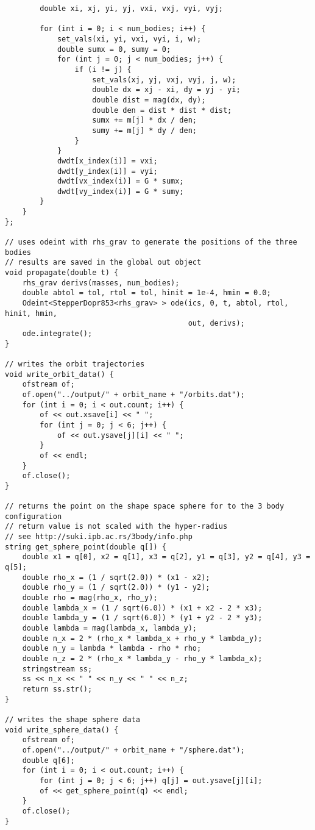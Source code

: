 \documentclass[12pt]{article}
\begin{document}
\begin{lstlisting}
        double xi, xj, yi, yj, vxi, vxj, vyi, vyj;

        for (int i = 0; i < num_bodies; i++) {
            set_vals(xi, yi, vxi, vyi, i, w);
            double sumx = 0, sumy = 0;
            for (int j = 0; j < num_bodies; j++) {
                if (i != j) {
                    set_vals(xj, yj, vxj, vyj, j, w);
                    double dx = xj - xi, dy = yj - yi;
                    double dist = mag(dx, dy);
                    double den = dist * dist * dist;
                    sumx += m[j] * dx / den;
                    sumy += m[j] * dy / den;
                }
            }
            dwdt[x_index(i)] = vxi;
            dwdt[y_index(i)] = vyi;
            dwdt[vx_index(i)] = G * sumx;
            dwdt[vy_index(i)] = G * sumy;
        }
    }
};

// uses odeint with rhs_grav to generate the positions of the three bodies
// results are saved in the global out object
void propagate(double t) {
    rhs_grav derivs(masses, num_bodies);
    double abtol = tol, rtol = tol, hinit = 1e-4, hmin = 0.0;
    Odeint<StepperDopr853<rhs_grav> > ode(ics, 0, t, abtol, rtol, hinit, hmin,
                                          out, derivs);
    ode.integrate();
}

// writes the orbit trajectories
void write_orbit_data() {
    ofstream of;
    of.open("../output/" + orbit_name + "/orbits.dat");
    for (int i = 0; i < out.count; i++) {
        of << out.xsave[i] << " ";
        for (int j = 0; j < 6; j++) {
            of << out.ysave[j][i] << " ";
        }
        of << endl;
    }
    of.close();
}

// returns the point on the shape space sphere for to the 3 body configuration
// return value is not scaled with the hyper-radius
// see http://suki.ipb.ac.rs/3body/info.php
string get_sphere_point(double q[]) {
    double x1 = q[0], x2 = q[1], x3 = q[2], y1 = q[3], y2 = q[4], y3 = q[5];
    double rho_x = (1 / sqrt(2.0)) * (x1 - x2);
    double rho_y = (1 / sqrt(2.0)) * (y1 - y2);
    double rho = mag(rho_x, rho_y);
    double lambda_x = (1 / sqrt(6.0)) * (x1 + x2 - 2 * x3);
    double lambda_y = (1 / sqrt(6.0)) * (y1 + y2 - 2 * y3);
    double lambda = mag(lambda_x, lambda_y);
    double n_x = 2 * (rho_x * lambda_x + rho_y * lambda_y);
    double n_y = lambda * lambda - rho * rho;
    double n_z = 2 * (rho_x * lambda_y - rho_y * lambda_x);
    stringstream ss;
    ss << n_x << " " << n_y << " " << n_z;
    return ss.str();
}

// writes the shape sphere data
void write_sphere_data() {
    ofstream of;
    of.open("../output/" + orbit_name + "/sphere.dat");
    double q[6];
    for (int i = 0; i < out.count; i++) {
        for (int j = 0; j < 6; j++) q[j] = out.ysave[j][i];
        of << get_sphere_point(q) << endl;
    }
    of.close();
}


\end{lstlisting}
\end{document}
